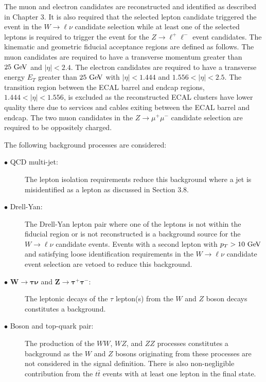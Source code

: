 The muon and electron candidates are reconstructed and identified as described in Chapter 3. It is also required that the selected lepton candidate triggered the event in the $W\rightarrow \ell\nu$ candidate selection while at least one of the selected leptons is required to trigger the event for the $Z\rightarrow \ell^{+}\ell^{-}$ event candidates. The kinematic and geometric fiducial acceptance regions are defined as follows. The muon candidates are required to have a transverse momentum greater than $25~\mathrm{Ge\kern -0.1em V}$ and $|\eta|<2.4$. The electron candidates are required to have a transverse energy $E_{T}$ greater than $25~\mathrm{Ge\kern -0.1em V}$ with $|\eta|<1.444$ and $1.556<|\eta|<2.5$.  The transition region between the ECAL barrel and endcap regions, $1.444<|\eta|<1.556$, is excluded as the reconstructed ECAL clusters have lower quality there due to services and cables exiting between the ECAL barrel and endcap. The two muon candidates in the  $Z\rightarrow \mu^{+}\mu^{-}$ candidate selection are required to be oppositely charged.

The following background processes are considered:
\begin{description}
\item[$\bullet$ QCD multi-jet:] The lepton isolation requirements reduce this background where a jet is misidentified as a lepton as discussed in Section 3.8.  
\item[$\bullet$ Drell-Yan:] The Drell-Yan lepton pair where one of the leptons is not within the fiducial region or is not reconstructed is a background source for the $W \rightarrow \ell\nu$ candidate events. Events with a second lepton with $p_{T}>10~\mathrm{Ge\kern -0.1em V}$ and satisfying loose identification requirements in the $W \rightarrow \ell\nu$ candidate event selection are vetoed to reduce this background. 
\item[$\bullet$ $\boldsymbol{W\rightarrow \tau\nu}$ and $\boldsymbol{Z\rightarrow \tau^{+}\tau^{-}}$:] The leptonic decays of the $\tau$ lepton(s) from the $W$ and $Z$ boson decays constitutes a background. 
\item[$\bullet$ Boson and top-quark pair:] The production of the $WW$, $WZ$, and $ZZ$ processes constitutes a background as the $W$ and $Z$ bosons originating from these processes are not considered in the signal definition. There is also non-negligible contribution from the $t\bar{t}$ events with at least one lepton in the final state.
\end{description}    

